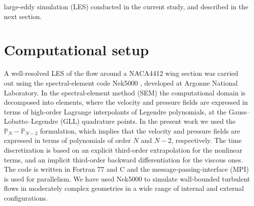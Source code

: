 \documentclass[preprint,12pt,authoryear]{elsarticle}
\begin{document}
large-eddy simulation (LES) conducted in the current study, and described in the next section.

\section{Computational setup}

A well-resolved LES of the flow around a NACA4412 wing section was carried out using the spectral-element code Nek5000 \citep{fischer_et_al}, developed at Argonne National Laboratory. In the spectral-element method (SEM) the computational domain is decomposed into elements, where the velocity and pressure fields are expressed in terms of high-order Lagrange interpolants of Legendre polynomials, at the Gauss--Lobatto--Legendre (GLL) quadrature points. In the present work we used the $\mathbb{P}_{N}-\mathbb{P}_{N-2}$ formulation, which implies that the velocity and pressure fields are expressed in terms of polynomials of order $N$ and $N-2$, respectively. The time discretization is based on an explicit third-order extrapolation for the nonlinear terms, and an implicit third-order backward differentiation for the viscous ones. The code is written in Fortran 77 and C and the message-passing-interface (MPI) is used for parallelism. We have used Nek5000 to simulate wall-bounded turbulent flows in moderately complex geometries in a wide range of internal \citep{marin_et_al} and external \citep{skyscraper} configurations.
\end{document}
